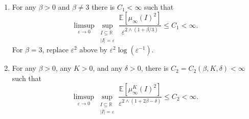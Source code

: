 \documentclass[10pt,a4paper]{amsart}
\newcommand*{\EE}{\ensuremath{\mathbb{E}}}	        	%
\newcommand*{\RR}{\ensuremath{\mathbb{R}}}	        	%
\newcommand*{\eps}{\ensuremath{\varepsilon}}            %
\begin{document}
\begin{prop}\label{prop:2nd_moment} $\hspace{1cm} $
    \begin{enumerate}
        \item [(i)]
    For any $\beta>0$ and $\beta \neq 3$ there is $C_1<\infty$ such that
    \begin{equation*}
        \limsup_{\eps \to 0} \sup_{\substack{I\subseteq \RR \\ \vert I \vert =\eps}} \frac{\EE\left[ \mu_\infty(I)^2\right]}{\eps^{2 \wedge(1+\beta/3)}} \leq C_1<\infty.
    \end{equation*}
    For $\beta=3$, replace $\eps^2$ above by $\eps^2 \log(\eps^{-1})$.

    \item [(ii)]
    For any $\beta>0 $, any $K>0$, and any $\delta>0$, there is $C_2=C_2(\beta, K, \delta)<\infty$ such that 
    \begin{equation*}
        \limsup_{\eps \to 0} \sup_{\substack{I\subseteq \RR \\ \vert I \vert =\eps}} \frac{\EE\left[ \mu^K_\infty(I)^2\right]}{\eps^{2 \wedge(1+2\beta-\delta)}} \leq C_2<\infty.
    \end{equation*}

    \end{enumerate}
\end{prop}
\end{document}
